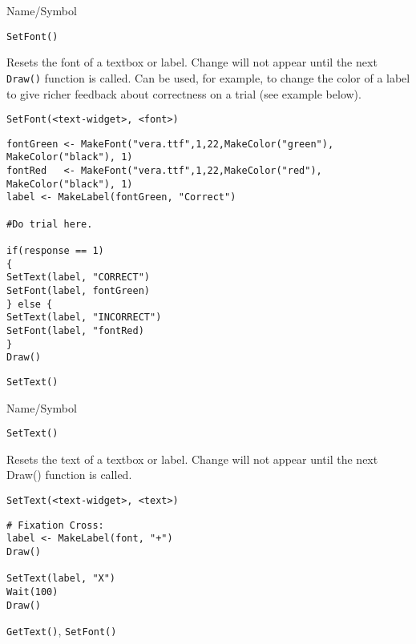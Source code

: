 \begin{desc}{Name/Symbol}
\item[Name/Symbol] 	\verb+SetFont()+

\item[Description] Resets the font of a textbox or label.  Change will
  not appear until the next \verb+Draw()+ function is called.  Can be
  used, for example, to change the color of a label to give richer
  feedback about correctness on a trial (see example below).

\item[Usage]
\begin{verbatim}
SetFont(<text-widget>, <font>)
\end{verbatim}

\item[Example]   	
\begin{verbatim}
fontGreen <- MakeFont("vera.ttf",1,22,MakeColor("green"),
MakeColor("black"), 1)
fontRed   <- MakeFont("vera.ttf",1,22,MakeColor("red"),
MakeColor("black"), 1)
label <- MakeLabel(fontGreen, "Correct")

#Do trial here.       	

if(response == 1)
{
SetText(label, "CORRECT")
SetFont(label, fontGreen)
} else {
SetText(label, "INCORRECT")
SetFont(label, "fontRed)
}
Draw()
\end{verbatim}

\item[See Also]    	\verb+SetText()+
\end{desc}

\rl


\begin{desc}{Name/Symbol}

\item[Name/Symbol] 	\verb+SetText()+

\item[Description] 	Resets the text of a textbox or label.  Change will not
		appear until the next Draw() function is called.

\item[Usage]
\begin{verbatim}
SetText(<text-widget>, <text>)
\end{verbatim}

\item[Example]
\begin{verbatim}
# Fixation Cross:
label <- MakeLabel(font, "+")
Draw()

SetText(label, "X")
Wait(100)
Draw()
\end{verbatim}

\item[See Also]    	\verb+GetText()+, \verb+SetFont()+
\end{desc}

